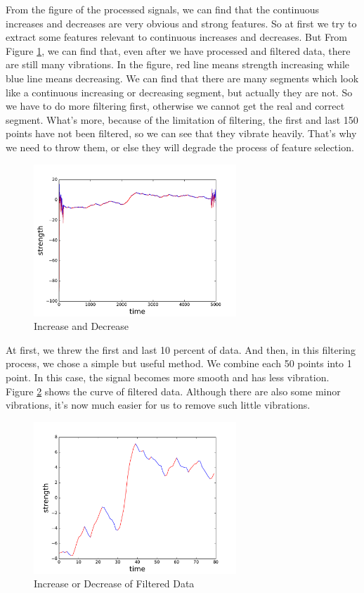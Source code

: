 \documentclass[conference]{IEEEtran}
\begin{document}
From the figure of the processed signals, we can find that the continuous increases and decreases are very obvious and strong features. So at first we try to extract some features relevant to continuous increases and decreases. But From Figure \ref{inc-dec}, we can find that, even after we have processed and filtered data, there are still many vibrations. In the figure, red line means strength increasing while blue line means decreasing. We can find that there are many segments which look like a continuous increasing or decreasing segment, but actually they are not. So we have to do more filtering first, otherwise we cannot get the real and correct segment. What's more, because of the limitation of filtering, the first and last 150 points have not been filtered, so we can see that they vibrate heavily. That's why we need to throw them, or else they will degrade the process of feature selection.

\begin{figure}[H]
\label{inc-dec}
\centering
\includegraphics[width=3in]{fs1.pdf}
\caption{Increase and Decrease}
\end{figure}

At first, we threw the first and last 10 percent of data. And then, in this filtering process, we chose a simple but useful method. We combine each 50 points into 1 point. In this case, the signal becomes more smooth and has less vibration. Figure \ref{inc-dec-filtered} shows the curve of filtered data. Although there are also some minor vibrations, it's now much easier for us to remove such little vibrations.


\begin{figure}[H]
\label{inc-dec-filtered}
\centering
\includegraphics[width=3in]{fs2.pdf}
\caption{Increase or Decrease of Filtered Data}
\end{figure}
\end{document}
